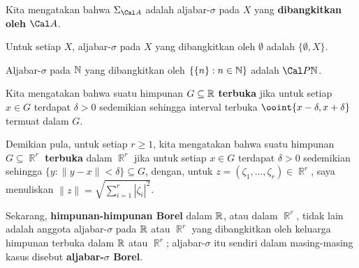 Kita mengatakan bahwa $\Sigma_{\Cal A}$ adalah aljabar-$\sigma$ pada
$X$ yang {\bf dibangkitkan oleh} $\Cal A$.

\medskip

 Untuk setiap $X$, aljabar-$\sigma$ pada $X$
yang dibangkitkan oleh $\emptyset$ adalah
$\{\emptyset,X\}$.

\medskip

 Aljabar-$\sigma$ pada $\Bbb N$
yang dibangkitkan oleh $\{\{n\}:n\in\Bbb N\}$ adalah $\Cal P\Bbb N$.

 Kita mengatakan bahwa suatu himpunan
$G\subseteq\Bbb R$ {\bf terbuka} jika untuk setiap $x\in G$ terdapat
$\delta>0$ sedemikian sehingga interval terbuka
$\ooint{x-\delta,x+\delta}$ termuat dalam $G$.

\medskip

 Demikian pula, untuk setiap $r\ge 1$, kita mengatakan
bahwa suatu himpunan $G\subseteq\BbbR^r$ {\bf terbuka} dalam
$\BbbR^r$ jika untuk setiap $x\in G$ terdapat $\delta>0$ sedemikian
sehingga $\{y:\|y-x\|<\delta\}\subseteq G$, dengan, untuk
$z=(\zeta_1,\ldots,\zeta_r)\in\BbbR^r$, saya menuliskan
$\|z\|=\sqrt{\sum_{i=1}^r|\zeta_i|^2}$.

 Sekarang, {\bf himpunan-himpunan Borel} dalam
$\Bbb R$, atau dalam $\BbbR^r$, tidak lain adalah anggota
aljabar-$\sigma$ pada $\Bbb R$ atau $\BbbR^r$ yang dibangkitkan oleh
keluarga himpunan terbuka dalam
$\Bbb R$ atau $\BbbR^r$; aljabar-$\sigma$ itu sendiri dalam masing-masing
kasus disebut {\bf aljabar-$\sigma$ Borel}.


